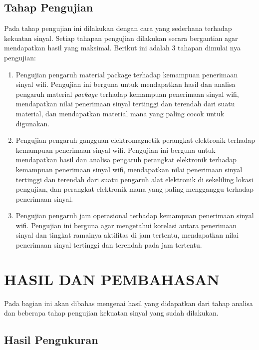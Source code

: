 \documentclass[conference]{IEEEtran}
\begin{document}
\subsection{Tahap Pengujian}
Pada tahap pengujian ini dilakukan dengan cara yang sederhana terhadap kekuatan sinyal. Setiap tahapan pengujian dilakukan secara bergantian agar mendapatkan hasil yang maksimal. Berikut ini adalah 3 tahapan dimulai nya pengujian:
\begin{enumerate}
    \item Pengujian pengaruh material package terhadap kemampuan penerimaan sinyal wifi. Pengujian ini berguna untuk mendapatkan hasil dan analisa pengaruh material \textit{package} terhadap kemampuan penerimaan sinyal wifi, mendapatkan nilai penerimaan sinyal tertinggi dan terendah dari suatu material, dan mendapatkan material mana yang paling cocok untuk digunakan.
    \item Pengujian pengaruh gangguan elektromagnetik perangkat elektronik terhadap kemampuan penerimaan sinyal wifi. Pengujian ini berguna untuk mendapatkan hasil dan analisa pengaruh perangkat elektronik terhadap kemampuan penerimaan sinyal wifi, mendapatkan nilai penerimaan sinyal tertinggi dan terendah dari suatu pengaruh alat elektronik di sekeliling lokasi pengujian, dan perangkat elektronik mana yang paling mengganggu terhadap penerimaan sinyal.
    \item Pengujian pengaruh jam operasional terhadap kemampuan penerimaan sinyal wifi. Pengujian ini berguna agar mengetahui korelasi antara penerimaan sinyal dan tingkat ramainya aktifitas di jam tertentu, mendapatkan nilai penerimaan sinyal tertinggi dan terendah pada jam tertentu.
\end{enumerate}

\section{HASIL DAN PEMBAHASAN}
Pada bagian ini akan dibahas mengenai hasil yang didapatkan dari tahap analisa dan beberapa tahap pengujian kekuatan sinyal yang sudah dilakukan.
\subsection{Hasil Pengukuran}
\end{document}
